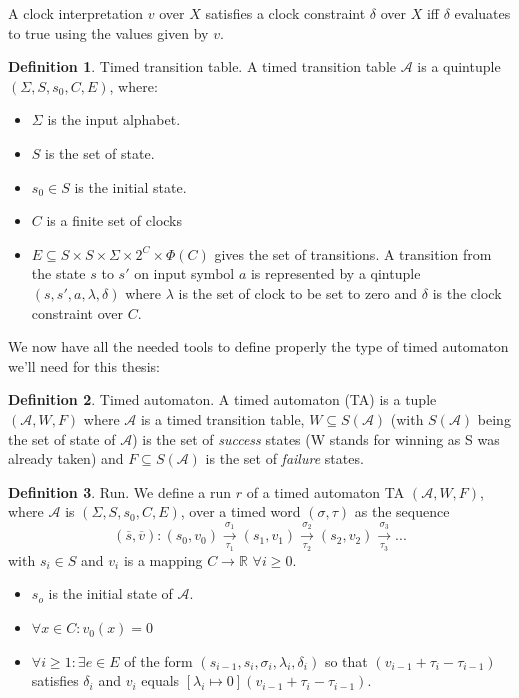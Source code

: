 \documentclass[12pt]{article}
\theoremstyle{definition}
\newtheorem{definition}{Definition}[section]
\theoremstyle{definition}
\theoremstyle{remark}
\newcommand{\R}{\mathbb{R}}
\newcommand{\A}{\mathcal{A}}
\begin{document}
A clock interpretation $v$ over $X$ satisfies a clock constraint $\delta$ over $X$ iff $\delta$ evaluates to true using the values given by $v$.

\theoremstyle{definition}
\begin{definition}{Timed transition table.} A timed transition table $\A$ is a quintuple $(\Sigma, S, s_{0},C, E)$, where:
\begin{itemize}
\item $\Sigma$ is the input alphabet.
\item $S$ is the set of state.
\item $s_{0} \in S$ is the initial state.
\item $C$ is a finite set of clocks
\item $E \subseteq S \times S \times \Sigma \times 2^{C} \times \Phi(C)$ gives the set of transitions. A transition from the state $s$ to $s'$ on input symbol $a$ is represented by a qintuple $(s, s', a, \lambda, \delta)$ where $\lambda$ is the set of clock to be set to zero and $\delta$ is the clock constraint over $C$.
\end{itemize}
\end{definition}

We now have all the needed tools to define properly the type of timed automaton we'll need for this thesis:

\theoremstyle{definition}
\begin{definition}{Timed automaton.} A timed automaton (TA) is a tuple $(\A, W, F)$ where $\A$ is a timed transition table, $W \subseteq S(\A)$ (with $S(\A)$ being the set of state of $\A$) is the set of \textit{success} states (W stands for winning as S was already taken) and $F \subseteq S(\A)$ is the set of \textit{failure} states.
\end{definition}

\theoremstyle{definition}
\begin{definition}{Run.} We define a run $r$ of a timed automaton TA $(\A, W, F)$, where $\A$ is $(\Sigma, S, s_{0},C, E)$, over a timed word $(\sigma, \tau)$ as the sequence
$$(\overline{s}, \overline{v}): (s_0, v_0) \xrightarrow[\tau_1]{\sigma_1} (s_1, v_1) \xrightarrow[\tau_2]{\sigma_2} (s_2, v_2) \xrightarrow[\tau_3]{\sigma_3} ...$$
with $s_i \in S$ and $v_i$ is a mapping $C \to \R$ $\forall i \ge 0$.
\begin{itemize}
\item $s_o$ is the initial state of $\A$.
\item $\forall x \in C: v_0(x) = 0$
\item $\forall i \ge 1: \exists e \in E$ of the form $(s_{i-1}, s_i, \sigma_i, \lambda_i, \delta_i)$ so that $(v_{i-1} + \tau_i - \tau_{i-1})$ satisfies $\delta_i$ and $v_i$ equals $[\lambda_i \mapsto 0](v_{i-1} + \tau_i - \tau_{i-1})$.~\cite{ALUR1994183}
\end{itemize}
\end{definition}
\end{document}
